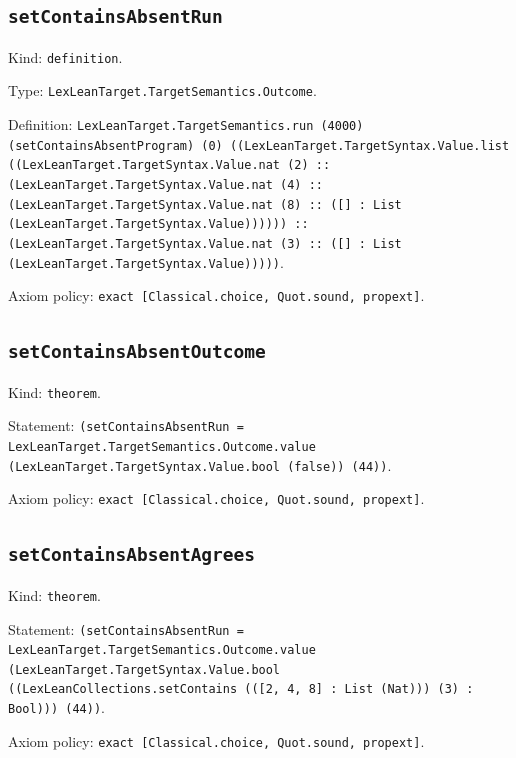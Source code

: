 \documentclass[11pt]{article}
\begin{document}
\subsection*{\texttt{setContainsAbsentRun}}
\noindent Kind: \texttt{definition}.\par
\noindent Type: \texttt{LexLeanTarget.TargetSemantics.Outcome}.\par
\noindent Definition: \texttt{LexLeanTarget.TargetSemantics.run (4000) (setContainsAbsentProgram) (0) ((LexLeanTarget.TargetSyntax.Value.list ((LexLeanTarget.TargetSyntax.Value.nat (2) :: (LexLeanTarget.TargetSyntax.Value.nat (4) :: (LexLeanTarget.TargetSyntax.Value.nat (8) :: ([] : List (LexLeanTarget.TargetSyntax.Value)))))) :: (LexLeanTarget.TargetSyntax.Value.nat (3) :: ([] : List (LexLeanTarget.TargetSyntax.Value)))))}.\par
\noindent Axiom policy: \texttt{exact [Classical.choice, Quot.sound, propext]}.\par
\subsection*{\texttt{setContainsAbsentOutcome}}
\noindent Kind: \texttt{theorem}.\par
\noindent Statement: \texttt{(setContainsAbsentRun = LexLeanTarget.TargetSemantics.Outcome.value (LexLeanTarget.TargetSyntax.Value.bool (false)) (44))}.\par
\noindent Axiom policy: \texttt{exact [Classical.choice, Quot.sound, propext]}.\par
\subsection*{\texttt{setContainsAbsentAgrees}}
\noindent Kind: \texttt{theorem}.\par
\noindent Statement: \texttt{(setContainsAbsentRun = LexLeanTarget.TargetSemantics.Outcome.value (LexLeanTarget.TargetSyntax.Value.bool ((LexLeanCollections.setContains (([2, 4, 8] : List (Nat))) (3) : Bool))) (44))}.\par
\noindent Axiom policy: \texttt{exact [Classical.choice, Quot.sound, propext]}.\par
\end{document}

